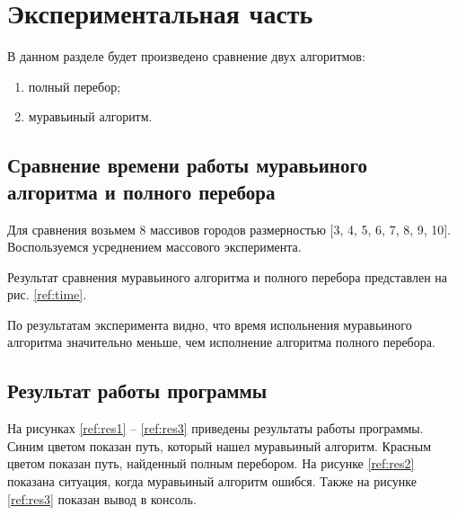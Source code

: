 \chapter{Экспериментальная часть}

В данном разделе будет произведено сравнение двух алгоритмов:

\begin{enumerate}
	\item полный перебор;
	\item муравьиный алгоритм.
\end{enumerate}

\section{Сравнение времени работы муравьиного алгоритма и полного перебора}

Для сравнения возьмем 8 массивов городов размерностью
$[$3, 4, 5, 6, 7, 8, 9, 10$]$.
Воспользуемся усреднением массового эксперимента.

Результат сравнения муравьиного алгоритма и полного перебора представлен на рис. \ref{ref:time}.

\begin{figure}[ht!]
\end{figure}

По результатам эксперимента видно, что время испольнения муравьиного алгоритма
значительно меньше, чем исполнение алгоритма полного перебора.

\newpage

\section{Результат работы программы}

На рисунках \ref{ref:res1} -- \ref{ref:res3} приведены результаты работы программы.
Синим цветом показан путь, который нашел муравьиный алгоритм.
Красным цветом показан путь, найденный полным перебором.
На рисунке \ref{ref:res2} показана ситуация, когда муравьиный алгоритм ошибся.
Также на рисунке \ref{ref:res3} показан вывод в консоль.

\begin{figure}[ht!]
\end{figure}

